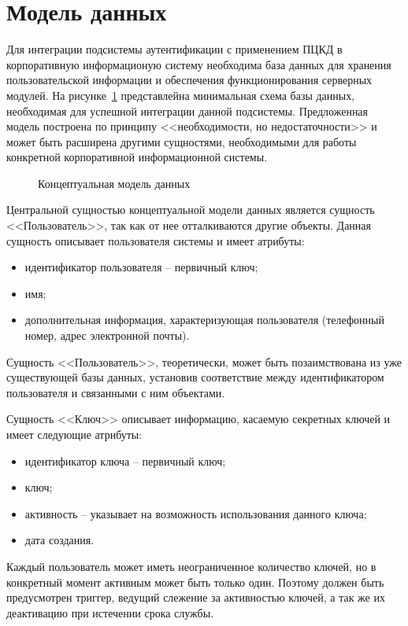 \section{Модель данных}

Для интеграции подсистемы аутентификации с применением ПЦКД в корпоративную
информационую систему необходима база данных для хранения пользовательской
информации и обеспечения функционирования серверных модулей. На
рисунке~\ref{ris:3.5} представлейна минимальная схема базы данных, необходимая
для успешной интеграции данной подсистемы. Предложенная модель построена по
принципу <<необходимости, но недостаточности>> и может быть расширена другими
сущностями, необходимыми для работы конкретной корпоративной информационной
системы.

\begin{figure}[h!]
\center{\texttt{[image: 3-5]}}
\caption{Концептуальная модель данных}
\label{ris:3.5}
\end{figure}

Центральной сущностью концептуальной модели данных является
сущность <<Пользователь>>, так как от нее отталкиваются другие объекты.
Данная сущность описывает пользователя системы и имеет атрибуты:
\begin{itemize}
  \item идентификатор пользователя -- первичный ключ;
  \item имя;
  \item дополнительная информация, характеризующая пользователя (телефонный
  номер, адрес электронной почты).
\end{itemize}

Сущность <<Пользователь>>, теоретически, может быть позаимствована из уже
существующей базы данных, установив соответствие между идентификатором
пользователя и связанными с ним объектами.

Сущность <<Ключ>> описывает информацию, касаемую секретных ключей и имеет
следующие атрибуты:

\begin{itemize}
  \item идентификатор ключа -- первичный ключ;
  \item ключ;
  \item активность -- указывает на возможность использования данного ключа;
  \item дата создания.
\end{itemize}

Каждый пользователь может иметь неограниченное количество ключей, но в
конкретный момент активным может быть только один. Поэтому должен быть
предусмотрен триггер, ведущий слежение за активностью ключей, а так же их
деактивацию при истечении срока службы.

